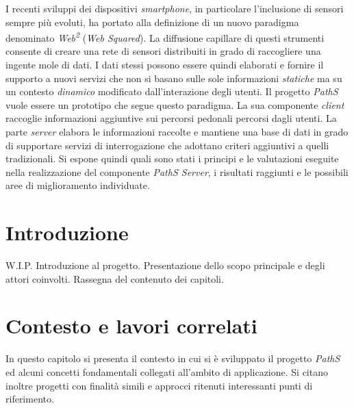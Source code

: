 \documentclass[a4paper, 12pt, twoside, openright]{book}
\newenvironment{abstract}{\cleardoublepage \null \vfill \begin{center}\bfseries\abstractname \end{center}}{\vfill\null}
\begin{document}
\begin{abstract} %
\markboth{}{} %
\thispagestyle{empty}
I recenti sviluppi dei dispositivi \emph{smartphone}, in particolare l'inclusione di sensori sempre più evoluti, ha portato alla definizione di un nuovo paradigma denominato \emph{Web\textsuperscript{2}} (\emph{Web Squared}). La diffusione capillare di questi strumenti consente di creare una rete di sensori distribuiti in grado di raccogliere una ingente mole di dati. I dati stessi possono essere quindi elaborati e fornire il supporto a nuovi servizi che non si basano sulle sole informazioni \emph{statiche} ma su un contesto \emph{dinamico} modificato dall'interazione degli utenti. Il progetto \emph{PathS} vuole essere un prototipo che segue questo paradigma. La sua componente \emph{client} raccoglie informazioni aggiuntive sui percorsi pedonali percorsi dagli utenti. La parte \emph{server} elabora le informazioni raccolte e mantiene una base di dati in grado di supportare servizi di interrogazione che adottano criteri aggiuntivi a quelli tradizionali.
Si espone quindi quali sono stati i principi e le valutazioni eseguite nella realizzazione del componente \emph{PathS Server}, i risultati raggiunti e le possibili aree di miglioramento individuate.
\end{abstract}


\mainmatter

\chapter{Introduzione} %
\thispagestyle{empty}

W.I.P.
Introduzione al progetto. Presentazione dello scopo principale e degli attori coinvolti. Rassegna del contenuto dei capitoli.

\chapter{Contesto e lavori correlati} %
\thispagestyle{empty}
In questo capitolo si presenta il contesto in cui si è sviluppato il progetto \emph{PathS} ed alcuni concetti fondamentali collegati all'ambito di applicazione. Si citano inoltre progetti con finalità simili e approcci ritenuti interessanti punti di riferimento.
\end{document}
